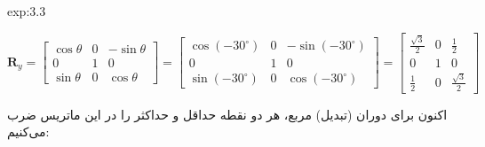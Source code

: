 {\begin{spacing}{1.5}
\begin{example}{exp:3.3}
            \begin{center}
                $\textbf{R}_{y}=\begin{bmatrix}
                                    \cos\theta & 0 & -\sin\theta \\
                                    0          & 1 & 0           \\
                                    \sin\theta & 0 & \cos\theta
                \end{bmatrix}=\begin{bmatrix}
                                  \cos(-30^\circ) & 0 & -\sin(-30^\circ) \\
                                  0               & 1 & 0                \\
                                  \sin(-30^\circ) & 0 & \cos(-30^\circ)
                \end{bmatrix}=\begin{bmatrix}
                                  \frac{\displaystyle \sqrt{\displaystyle 3}}{\displaystyle 2} & 0 & \frac{\displaystyle 1}{\displaystyle 2}                      \\
                                  0                                                            & 1 & 0                                                            \\
                                  \frac{\displaystyle 1}{\displaystyle 2}                      & 0 & \frac{\displaystyle \sqrt{\displaystyle 3}}{\displaystyle 2}
                \end{bmatrix}$
            \end{center}

            اکنون برای دوران (تبدیل) مربع، هر دو نقطه حداقل و حداکثر را در این ماتریس ضرب می‌کنیم:


\end{example}
\end{spacing}}
